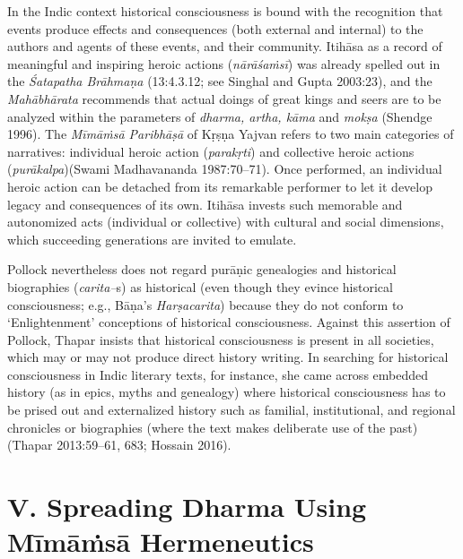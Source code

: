 In the Indic context historical consciousness is bound with the recognition that events produce effects and consequences (both external and internal) to the authors and agents of these events, and their community. Itihāsa as a record of meaningful and inspiring heroic actions (\textit{nārāśaṁsī}) was already spelled out in the \textit{Śatapatha Brāhmaṇa} (13:4.3.12; see Singhal and Gupta 2003:23), and the \textit{Mahābhārata} recommends that actual doings of great kings and seers are to be analyzed within the parameters of \textit{dharma, artha, kāma} and \textit{mokṣa} (Shendge 1996). The \textit{Mīmāṁsā Paribhāṣā} of Kṛṣṇa Yajvan refers to two main categories of narratives: individual heroic action (\textit{parakṛti}) and collective heroic actions (\textit{purākalpa})(Swami Madhavananda 1987:70–71). Once performed, an individual heroic action can be detached from its remarkable performer to let it develop legacy and consequences of its own. Itihāsa invests such memorable and autonomized acts (individual or collective) with cultural and social dimensions, which succeeding generations are invited to emulate.

Pollock nevertheless does not regard purāṇic genealogies and historical biographies (\textit{carita–}s) as historical (even though they evince historical consciousness; e.g., Bāṇa’s \textit{Harṣacarita}) because they do not conform to ‘Enlightenment’ conceptions of historical consciousness. Against this assertion of Pollock, Thapar insists that historical consciousness is present in all societies, which may or may not produce direct history writing. In searching for historical consciousness in Indic literary texts, for instance, she came across embedded history (as in epics, myths and genealogy) where historical consciousness has to be prised out and externalized history such as familial, institutional, and regional chronicles or biographies (where the text makes deliberate use of the past)(Thapar 2013:59–61, 683; Hossain 2016).


\section*{V. Spreading Dharma Using Mīmāṁsā Hermeneutics}

